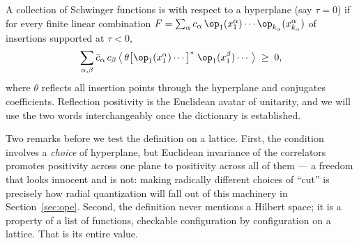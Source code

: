\begin{ddefinition}
\label{def:reflection-positivity}
A collection of Schwinger functions is  with respect
to a hyperplane (say $\tau = 0$) if for every finite linear combination $F =
\sum_\alpha c_\alpha\, \op_{1}(x^\alpha_1)\cdots\op_{k_\alpha}(x^\alpha_{k_\alpha})$
of insertions supported at $\tau < 0$,
\begin{equation}
\sum_{\alpha,\beta} \bar c_\alpha\, c_\beta \,
\big\langle\, \theta\big[\op_{1}(x^\alpha_1)\cdots\big]^{*} \;
\op_{1}(x^\beta_1)\cdots \,\big\rangle \;\ge\; 0,
\label{eq:rp-def}
\end{equation}
where $\theta$ reflects all insertion points through the hyperplane and
conjugates coefficients. Reflection positivity is the Euclidean avatar of
unitarity, and we will use the two words interchangeably once the dictionary is
established.
\end{ddefinition}

\noin Two remarks before we test the definition on a lattice. First, the
condition involves a \emph{choice} of hyperplane, but Euclidean invariance of
the correlators promotes positivity across one plane to positivity across all
of them --- a freedom that looks innocent and is not: making radically
different choices of ``cut'' is precisely how radial quantization will fall out
of this machinery in Section~\ref{sec:ope}. Second, the definition never
mentions a Hilbert space; it is a property of a list of functions, checkable
configuration by configuration on a lattice. That is its entire value.

